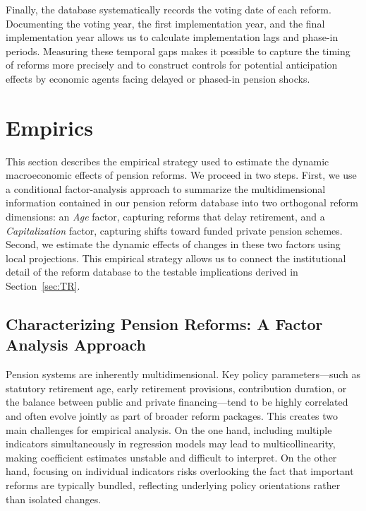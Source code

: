 \documentclass[11pt,english,a4paper, twoside, authoryear]{article}
\begin{document}
Finally, the database systematically records the voting date of each reform. Documenting the voting year, the first implementation year, and the final implementation year allows us to calculate implementation lags and phase-in periods. Measuring these temporal gaps makes it possible to capture the timing of reforms more precisely and to construct controls for potential anticipation effects by economic agents facing delayed or phased-in pension shocks.





\section{Empirics}


This section describes the empirical strategy used to estimate the dynamic macroeconomic effects of pension reforms. We proceed in two steps. First, we use a conditional factor-analysis approach to summarize the multidimensional information contained in our pension reform database into two orthogonal reform dimensions: an \emph{Age} factor, capturing reforms that delay retirement, and a \emph{Capitalization} factor, capturing shifts toward funded private pension schemes. Second, we estimate the dynamic effects of changes in these two factors using local projections. This empirical strategy allows us to connect the institutional detail of the reform database to the testable implications derived in Section~\ref{sec:TR}.


\subsection{Characterizing Pension Reforms: A Factor Analysis Approach}
\label{sec:pcfa}

Pension systems are inherently multidimensional. Key policy parameters---such as statutory retirement age, early retirement provisions, contribution duration, or the balance between public and private financing---tend to be highly correlated and often evolve jointly as part of broader reform packages. This creates two main challenges for empirical analysis. On the one hand, including multiple indicators simultaneously in regression models may lead to multicollinearity, making coefficient estimates unstable and difficult to interpret. On the other hand, focusing on individual indicators risks overlooking the fact that important reforms are typically bundled, reflecting underlying policy orientations rather than isolated changes.
\end{document}
